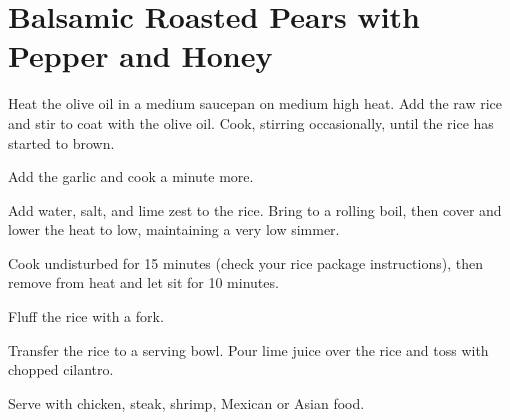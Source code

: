 \section{Balsamic Roasted Pears with Pepper and Honey}
\begin{recipe}




Heat the olive oil in a medium saucepan on medium high heat. Add the raw rice and stir to coat with the olive oil. Cook, stirring occasionally, until the rice has started to brown.

Add the garlic and cook a minute more.

Add water, salt, and lime zest to the rice. Bring to a rolling boil, then cover and lower the heat to low, maintaining a very low simmer.

Cook undisturbed for 15 minutes (check your rice package instructions), then remove from heat and let sit for 10 minutes.

Fluff the rice with a fork.

Transfer the rice to a serving bowl. Pour lime juice over the rice and toss with chopped cilantro.

Serve with chicken, steak, shrimp, Mexican or Asian food.



\end{recipe}

